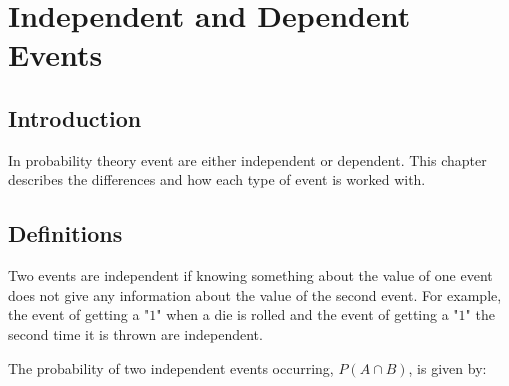 \chapter{Independent and Dependent Events}
\label{m:p11}



\section{Introduction}
In probability theory event are either independent or dependent. This chapter describes the differences and how each type of event is worked with.

\section{Definitions}
Two events are independent if knowing something about the value of one event does not give any information about the value of the second event. For example, the event of getting a "$1$" when a die is rolled and the event of getting a "$1$" the second time it is thrown are independent.


The probability of two independent events occurring, $P(A \cap B)$, is given by:


